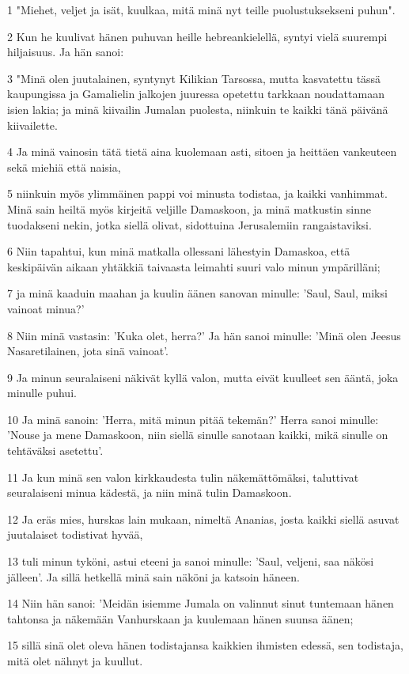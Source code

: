 \par 1 "Miehet, veljet ja isät, kuulkaa, mitä minä nyt teille puolustuksekseni puhun".
\par 2 Kun he kuulivat hänen puhuvan heille hebreankielellä, syntyi vielä suurempi hiljaisuus. Ja hän sanoi:
\par 3 "Minä olen juutalainen, syntynyt Kilikian Tarsossa, mutta kasvatettu tässä kaupungissa ja Gamalielin jalkojen juuressa opetettu tarkkaan noudattamaan isien lakia; ja minä kiivailin Jumalan puolesta, niinkuin te kaikki tänä päivänä kiivailette.
\par 4 Ja minä vainosin tätä tietä aina kuolemaan asti, sitoen ja heittäen vankeuteen sekä miehiä että naisia,
\par 5 niinkuin myös ylimmäinen pappi voi minusta todistaa, ja kaikki vanhimmat. Minä sain heiltä myös kirjeitä veljille Damaskoon, ja minä matkustin sinne tuodakseni nekin, jotka siellä olivat, sidottuina Jerusalemiin rangaistaviksi.
\par 6 Niin tapahtui, kun minä matkalla ollessani lähestyin Damaskoa, että keskipäivän aikaan yhtäkkiä taivaasta leimahti suuri valo minun ympärilläni;
\par 7 ja minä kaaduin maahan ja kuulin äänen sanovan minulle: 'Saul, Saul, miksi vainoat minua?'
\par 8 Niin minä vastasin: 'Kuka olet, herra?' Ja hän sanoi minulle: 'Minä olen Jeesus Nasaretilainen, jota sinä vainoat'.
\par 9 Ja minun seuralaiseni näkivät kyllä valon, mutta eivät kuulleet sen ääntä, joka minulle puhui.
\par 10 Ja minä sanoin: 'Herra, mitä minun pitää tekemän?' Herra sanoi minulle: 'Nouse ja mene Damaskoon, niin siellä sinulle sanotaan kaikki, mikä sinulle on tehtäväksi asetettu'.
\par 11 Ja kun minä sen valon kirkkaudesta tulin näkemättömäksi, taluttivat seuralaiseni minua kädestä, ja niin minä tulin Damaskoon.
\par 12 Ja eräs mies, hurskas lain mukaan, nimeltä Ananias, josta kaikki siellä asuvat juutalaiset todistivat hyvää,
\par 13 tuli minun tyköni, astui eteeni ja sanoi minulle: 'Saul, veljeni, saa näkösi jälleen'. Ja sillä hetkellä minä sain näköni ja katsoin häneen.
\par 14 Niin hän sanoi: 'Meidän isiemme Jumala on valinnut sinut tuntemaan hänen tahtonsa ja näkemään Vanhurskaan ja kuulemaan hänen suunsa äänen;
\par 15 sillä sinä olet oleva hänen todistajansa kaikkien ihmisten edessä, sen todistaja, mitä olet nähnyt ja kuullut.
